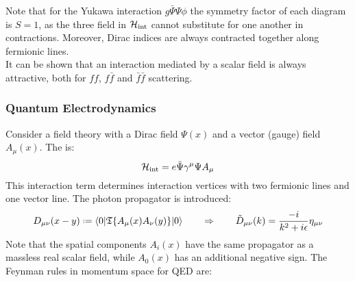 Note that for the Yukawa interaction $ g \bar{\Psi} \Psi \phi $ the symmetry factor of each diagram is $ S = 1 $, as the three field in $ \mathcal{H}_\text{int} $ cannot substitute for one another in contractions. Moreover, Dirac indices are always contracted together along fermionic lines. \\
It can be shown that an interaction mediated by a scalar field is always attractive, both for $ ff $, $ f\bar{f} $ and $ \bar{f}\bar{f} $ scattering.

\subsubsection{Quantum Electrodynamics}

Consider a field theory with a Dirac field $ \Psi(x) $ and a vector (gauge) field $ A_\mu(x) $. The  is:
\begin{equation}
  \mathcal{H}_\text{int} = e \bar{\Psi} \gamma^\mu \Psi A_\mu
\end{equation}
This interaction term determines interaction vertices with two fermionic lines and one vector line.
The photon propagator is introduced:
\begin{equation}
  D_{\mu \nu}(x-y) \defeq \braket{0 | \tempord\{A_\mu(x) A_\nu(y)\} | 0}
  \qquad \Rightarrow \qquad
  \tilde{D}_{\mu \nu}(k) = \frac{-i}{k^2 + i\epsilon} \eta_{\mu \nu}
\end{equation}
Note that the spatial components $ A_i(x) $ have the same propagator as a massless real scalar field, while $ A_0(x) $ has an additional negative sign.
The Feynman rules in momentum space for QED are:

